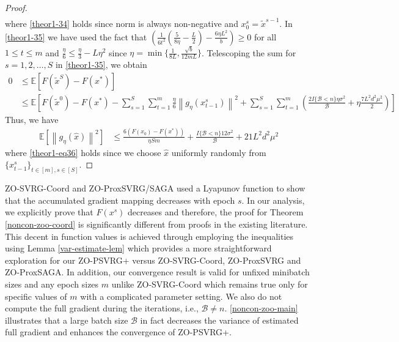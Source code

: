 \documentclass{article}
\newcommand*{\E}{\mathbb{E}}
\newcommand{\norm}[1]{\left\lVert#1\right\rVert}
\theoremstyle{definition}
\theoremstyle{remark}
\begin{document}
\begin{proof}
\begin{align}
 \end{align}
 where \eqref{theor1-34} holds since norm is always non-negative and $x_0^s = \tilde{x}^{s-1}$. In \eqref{theor1-35} we have used the fact that $(\frac{1}{6t^2}(\frac{5}{8\eta} - \frac{L}{2})-\frac{6\eta L^2 }{b})\geq 0$ for all $1\leq t \leq m$ and $\frac{\eta}{6} \leq \frac{\eta}{3}-L\eta^2$ since $\eta = \min\{\frac{1}{8L}, \frac{\sqrt{b}}{12 mL}\}$. 
 Telescoping the sum for $s = 1, 2, \ldots, S$ in \eqref{theor1-35}, we obtain
 \begin{equation*}
\begin{split} 
0 &\leq \E[F(\tilde{x}^S) - F({x}^*)] \\
&\leq \E\left[F(\tilde{x}^{0}) - F({x}^*) - \sum_{s=1}^S\sum_{t=1}^m\frac{\eta}{6}\norm{g_{\eta}(x_{t-1}^s)}^2 + \sum_{s=1}^S\sum_{t=1}^m(\frac{2I\{\mathcal{B} < n\}\eta \sigma ^2}{\mathcal{B}}+\eta \frac{7 L^2 d^2 \mu^2}{2})\right]
 \end{split}
 \end{equation*}
 Thus, we have
  \begin{align}
\E[\norm{g_{\eta}(\hat{x})}^2] & \leq \frac{6\left(F(x_0) - F({x}^*)\right)}{\eta Sm} + \frac{I\{\mathcal{B} < n\}12\sigma ^2}{\mathcal{B}}+21{L^2 d^2 \mu^2}\label{theor1-eq36}
 \end{align}
 where \eqref{theor1-eq36} holds since we choose  $\hat{x}$ uniformly randomly from $\{x_{t-1}^s\}_{t\in [m], s\in [S]}$. 
\end{proof} 
ZO-SVRG-Coord and ZO-ProxSVRG/SAGA used a Lyapunov function to show that the accumulated gradient mapping decreases with epoch $s$. In our analysis, we explicitly prove that $F(x^s)$ decreases and therefore, the proof for Theorem \ref{noncon-zoo-coord} is significantly different from proofs in the existing literature. This  decent in function values is achieved through employing the inequalities using Lemma \ref{var-estimate-lem} which provides a more straightforward exploration for our ZO-PSVRG+ versus ZO-SVRG-Coord, ZO-ProxSVRG and ZO-ProxSAGA. In addition, our convergence result is valid for unfixed minibatch sizes and any epoch sizes $m$ unlike ZO-SVRG-Coord which remains true only for specific values of $m$ with a complicated parameter setting.
We also do not compute the full gradient during the iterations, i.e., $\mathcal{B} \neq n$.
 \eqref{noncon-zoo-main} illustrates that a large batch size $\mathcal{B}$ in fact decreases the variance of estimated full gradient and enhances the convergence of ZO-PSVRG+.
\end{document}
